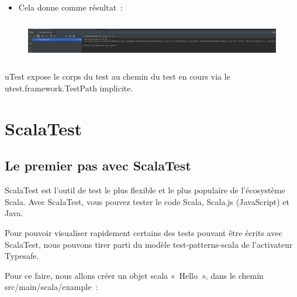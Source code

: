 \documentclass[12pt]{article}
\begin{document}
\begin{itemize}
	\item Cela donne comme résultat :
\end{itemize}\par




\begin{figure}[H]
	\begin{Center}
		\includegraphics[width=6.3in,height=0.69in]{./media/image14.png}
	\end{Center}
\end{figure}



\par


\vspace{\baselineskip}
uTest expose le corps du test au chemin du test en cours via le utest.framework.TestPath implicite.\par

\section{ScalaTest}

\subsection{Le premier pas avec ScalaTest}

ScalaTest est l'outil de test le plus flexible et le plus populaire de l'écosystème Scala. Avec ScalaTest, vous pouvez tester le code Scala, Scala.js (JavaScript) et Java.\par

Pour pouvoir visualiser rapidement certains des tests pouvant être écrits avec ScalaTest, nous pouvons tirer parti du modèle test-patterns-scala de l’activateur Typesafe.\par

Pour ce faire, nous allons créer un objet scala « Hello », dans le chemin src/main/scala/example :\par
\end{document}

